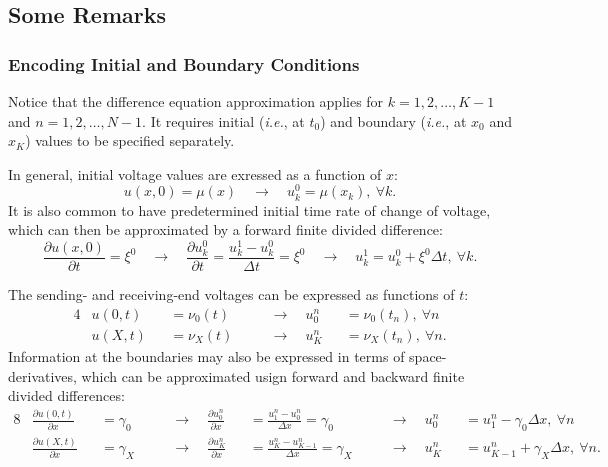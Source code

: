 \documentclass{article}
\begin{document}
\subsection{Some Remarks}
\label{subsec: Some Remarks}

\subsubsection{Encoding Initial and Boundary Conditions}
\label{subsubsec: Encoding Initial and Boundary Conditions}

Notice that the difference equation approximation applies for $k=1,2,\ldots,K-1$ and $n=1,2,\ldots,N-1$.
It requires initial (\textit{i.e.}, at $t_{0}$) and boundary (\textit{i.e.}, at $x_{0}$ and $x_{K}$) values to be specified separately.

In general, initial voltage values are exressed as a function of $x$:
\begin{equation*}
   u \left(x,0\right) = \mu \left(x\right)
   \quad\longrightarrow\quad
   u_{k}^{0} = \mu \left(x_{k}\right),\ \forall k.
\end{equation*}
It is also common to have predetermined initial time rate of change of voltage,
which can then be approximated by a forward finite divided difference:
\begin{equation*}
   \frac{\partial u \left(x,0\right)}{\partial t} = \xi^{0}
   \quad\longrightarrow\quad
   \frac{\partial u_{k}^{0}}{\partial t} =
   \frac{u_{k}^{1} - u_{k}^{0}}{\Delta t} = \xi^{0}
   \quad\longrightarrow\quad
   u_{k}^{1} = u_{k}^{0} + \xi^{0} \Delta t,\ \forall k.
\end{equation*}

The sending- and receiving-end voltages can be expressed as functions of $t$:
\begin{alignat*}{4}
   & u \left(0,t\right) &&= \nu_{0} \left(t\right)
   &&\quad\longrightarrow\quad
   u_{0}^{n} &&= \nu_{0} \left(t_n\right),\ \forall n \\
   & u \left(X,t\right) &&= \nu_{X} \left(t\right)
   &&\quad\longrightarrow\quad
   u_{K}^{n} &&= \nu_{X} \left(t_n\right),\ \forall n.
\end{alignat*}
Information at the boundaries may also be expressed in terms of space-derivatives,
which can be approximated usign forward and backward finite divided differences:
\begin{alignat*}{8}
   & \frac{\partial u \left(0,t\right)}{\partial x} &&= \gamma_{0}
   &&\quad\longrightarrow\quad
   \frac{\partial u_{0}^{n}}{\partial x} &&= \frac{u_{1}^{n} - u_{0}^{n}}{\Delta x} = \gamma_{0}
   &&\quad\longrightarrow\quad
   u_{0}^{n} &&= u_{1}^{n} - \gamma_{0} \Delta x,\ \forall n \\
   & \frac{\partial u \left(X,t\right)}{\partial x} &&= \gamma_{X}
   &&\quad\longrightarrow\quad
   \frac{\partial u_{K}^{n}}{\partial x} &&= \frac{u_{K}^{n} - u_{K-1}^{n}}{\Delta x} = \gamma_{X}
   &&\quad\longrightarrow\quad
   u_{K}^{n} &&= u_{K-1}^{n} + \gamma_{X} \Delta x,\ \forall n.
\end{alignat*}
\end{document}
